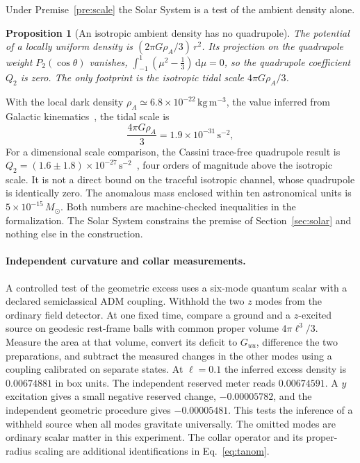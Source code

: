 \documentclass[11pt]{article}
\newcommand{\dd}{\,\mathrm d}
\newtheorem{proposition}[theorem]{Proposition}
\begin{document}
Under Premise~\ref{pre:scale} the Solar System is a test of the ambient
density alone.

\begin{proposition}[An isotropic ambient density has no quadrupole]
\label{prop:isotropic}
The potential of a locally uniform density is \((2\pi G\rho_A/3)\,r^2\). Its
projection on the quadrupole weight \(P_2(\cos\theta)\) vanishes,
\(\int_{-1}^{1}(\mu^2-\tfrac13)\dd\mu=0\), so the quadrupole coefficient
\(Q_2\) is zero. The only footprint is the isotropic tidal scale
\(4\pi G\rho_A/3\).
\end{proposition}

With the local dark density
\(\rho_A\simeq6.8\times10^{-22}\,\mathrm{kg\,m^{-3}}\), the value inferred
from Galactic kinematics~\cite{desalas2021}, the tidal scale is
\begin{equation}
\frac{4\pi G\rho_A}{3}=1.9\times10^{-31}\,\mathrm{s^{-2}},
\label{eq:tidal}
\end{equation}
For a dimensional scale comparison, the Cassini trace-free quadrupole result
is \(Q_2=(1.6\pm1.8)\times10^{-27}\,\mathrm{s^{-2}}\)~\cite{park2026}, four
orders of magnitude above the isotropic scale. It is not a direct bound on
the traceful isotropic channel, whose quadrupole is identically zero. The
anomalous mass enclosed within ten astronomical units is
\(5\times10^{-15}\,M_\odot\). Both numbers are machine-checked inequalities
in the formalization. The Solar System constrains the premise of
Section~\ref{sec:solar} and nothing else in the construction.

\paragraph{Independent curvature and collar measurements.}
A controlled test of the geometric excess uses a six-mode quantum scalar
with a declared semiclassical ADM coupling. Withhold the two $z$ modes
from the ordinary field detector. At one fixed time, compare a ground
and a $z$-excited source on geodesic rest-frame balls with common
proper volume $4\pi\ell^3/3$. Measure the area at that volume, convert
its deficit to $G_{uu}$, difference the two preparations, and subtract
the measured changes in the other modes using a coupling calibrated
on separate states. At $\ell=0.1$ the inferred excess density is
$0.00674881$ in box units. The independent reserved meter reads
$0.00674591$. A $y$ excitation gives a small negative reserved change,
$-0.00005782$, and the independent geometric procedure gives
$-0.00005481$. This tests the inference of a withheld source when all
modes gravitate universally. The omitted modes are ordinary scalar
matter in this experiment. The collar operator and its proper-radius
scaling are additional identifications in Eq.~\eqref{eq:tanom}.
\end{document}
